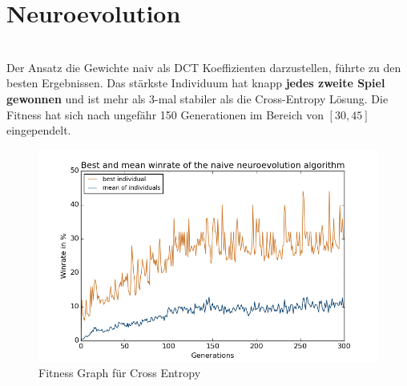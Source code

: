             \section{Neuroevolution}
                \begin{multicols}{2}
                    \noindent
                    \\[5mm]
                    Der Ansatz die Gewichte naiv als DCT Koeffizienten darzustellen, führte zu den besten Ergebnissen. Das stärkste Individuum hat knapp \textbf{jedes zweite Spiel gewonnen} und ist mehr als 3-mal stabiler als die Cross-Entropy Lösung. Die Fitness hat sich nach ungefähr 150 Generationen im Bereich von $[30,45]$ eingependelt.
                    \begin{figure}[H]
                       \includegraphics[scale=0.5]{../pictures/summary/neural-fitness.png}
                       \caption{Fitness Graph für Cross Entropy}\label{fig:graph-ne}
                    \end{figure}
                \end{multicols}

